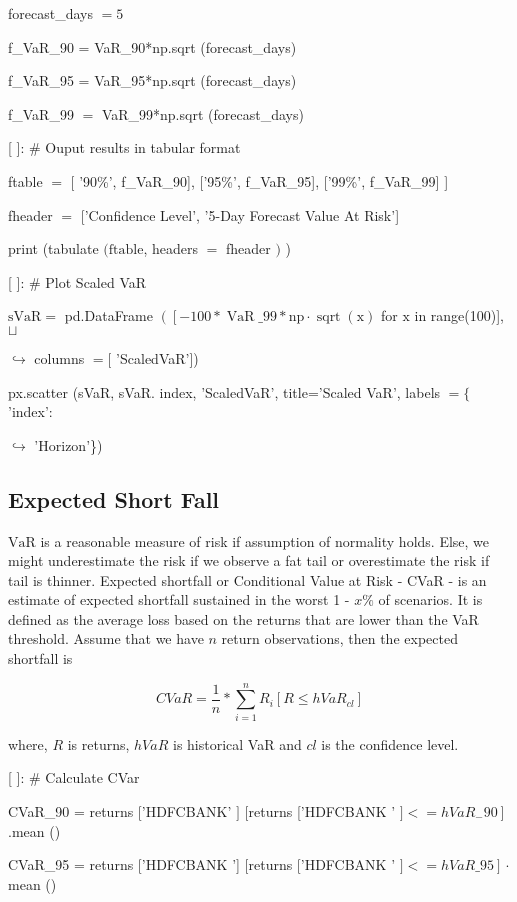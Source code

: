 \documentclass[10pt]{article}
\begin{document}
forecast\_days $=5$

f\_VaR\_90 = VaR\_90*np.sqrt (forecast\_days)

f\_VaR\_95 = VaR\_95*np.sqrt (forecast\_days)

f\_VaR\_99 $=$ VaR\_99*np.sqrt (forecast\_days)

[ ]: \# Ouput results in tabular format

ftable $=$ [ '90\%', f\_VaR\_90], ['95\%', f\_VaR\_95], ['99\%', f\_VaR\_99] ]

fheader $=$ ['Confidence Level', '5-Day Forecast Value At Risk']

print (tabulate $(\mathrm{ftable}$, headers $=$ fheader $)$ )

[ ]: \# Plot Scaled VaR

$\mathrm{sVaR}=$ pd.DataFrame $\left(\left[-100 * \operatorname{VaR} \_99 * \mathrm{np} \cdot \operatorname{sqrt}(\mathrm{x})\right.\right.$ for $\mathrm{x}$ in range(100)], $\sqcup$

$\hookrightarrow$ columns $=[$ 'ScaledVaR'])

px.scatter (sVaR, sVaR. index, 'ScaledVaR', title='Scaled VaR', labels $=\{$ 'index':

$\hookrightarrow$ 'Horizon'\})

\subsection*{Expected Short Fall}
$\mathrm{VaR}$ is a reasonable measure of risk if assumption of normality holds. Else, we might underestimate the risk if we observe a fat tail or overestimate the risk if tail is thinner. Expected shortfall or Conditional Value at Risk - CVaR - is an estimate of expected shortfall sustained in the worst 1 - $x \%$ of scenarios. It is defined as the average loss based on the returns that are lower than the VaR threshold. Assume that we have $n$ return observations, then the expected shortfall is

$$
C V a R=\frac{1}{n} * \sum_{i=1}^{n} R_{i}\left[R \leq h V a R_{c l}\right]
$$

where, $R$ is returns, $h V a R$ is historical VaR and $c l$ is the confidence level.

[ ]: \# Calculate CVar

CVaR\_90 = returns ['HDFCBANK' $]$ [returns ['HDFCBANK ' $\left.]<=h V a R_{-} 90\right]$.mean ()

CVaR\_95 = returns ['HDFCBANK '] [returns ['HDFCBANK ' $\left.]<=h V a R \_95\right] \cdot$ mean ()
\end{document}
